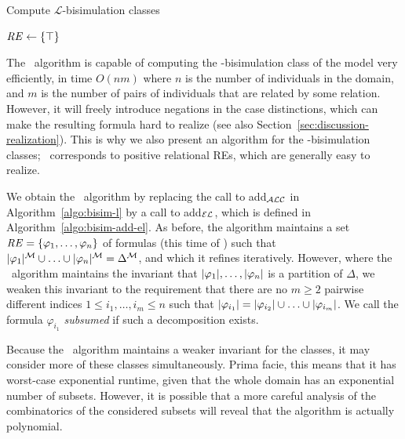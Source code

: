 \begin{algorithm}[t]
\dontprintsemicolon
\caption{Compute $\mathcal{L}$-bisimulation classes}
\label{algo:bisim-l}

$\mathit{RE} \leftarrow \{\top\}$


\end{algorithm}

The \alc\ algorithm is capable of computing the \alc-bisimulation
class of the model very efficiently, in time $O(nm)$ where $n$ is the
number of individuals in the domain, and $m$ is the number of pairs of
individuals that are related by some relation.  However, it will
freely introduce negations in the case distinctions, which can make
the resulting formula hard to realize (see also
Section~\ref{sec:discussion-realization}).  This is why we also
present an algorithm for the \el-bisimulation classes; \el\
corresponds to positive relational REs, which are generally easy to
realize.

We obtain the \el\ algorithm by replacing the call to add$_{\mathcal{ALC}}$ in
Algorithm~\ref{algo:bisim-l} by a call to add$_{\mathcal{EL}}$, which is defined
in Algorithm~\ref{algo:bisim-add-el}.  As before, the algorithm
maintains a set $\mathit{RE} = \{\varphi_1,\ldots,\varphi_n\}$ of formulas
(this time of \el) such that $|\varphi_1|^{\mathcal{M}} \cup \ldots \cup
|\varphi_n|^{\mathcal{M}} = \Delta^{\mathcal{M}}$, and which it refines
iteratively.  However, where the \alc\ algorithm maintains the
invariant that $|\varphi_1|,\ldots,|\varphi_n|$ is a
partition of $\Delta$, we weaken this invariant to the requirement
that there are no $m \geq 2$ pairwise different indices $1 \leq
i_1,\ldots,i_m \leq n$ such that $|\varphi_{i_1}| =
|\varphi_{i_2}| \cup \ldots \cup |\varphi_{i_m}|$.  We
call the formula $\varphi_{i_1}$ \emph{subsumed} if such a
decomposition exists.


Because the \el\ algorithm maintains a weaker invariant for the
classes, it may consider more of these classes simultaneously.  Prima
facie, this means that it has worst-case exponential runtime, given
that the whole domain has an exponential number of subsets.  However,
it is possible that a more careful analysis of the combinatorics of
the considered subsets will reveal that the algorithm is actually
polynomial.


